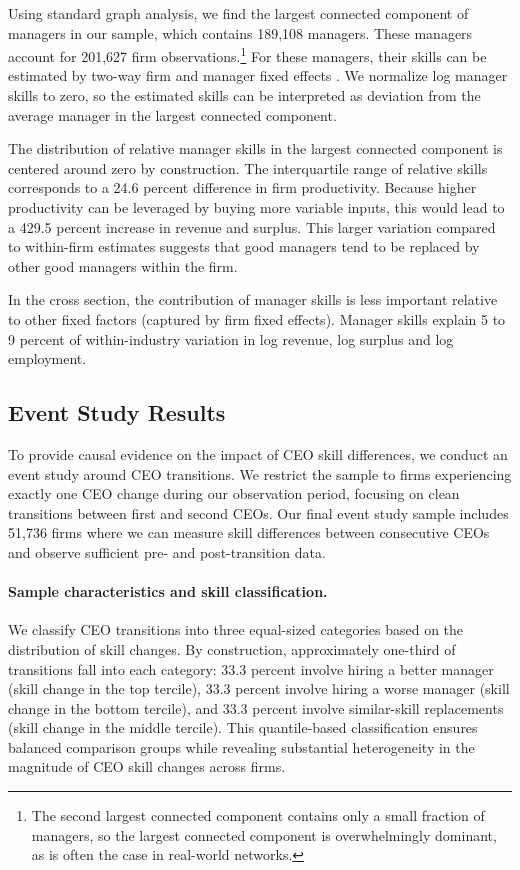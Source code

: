 \documentclass[11pt,a4paper]{article}
\begin{document}
Using standard graph analysis, we find the largest connected component of managers in our sample, which contains 189,108 managers. These managers account for 201,627 firm observations.\footnote{The second largest connected component contains only a small fraction of managers, so the largest connected component is overwhelmingly dominant, as is often the case in real-world networks.} For these managers, their skills can be estimated by two-way firm and manager fixed effects \citep{Abowd1999Econometrica,reghdfe}. We normalize log manager skills to zero, so the estimated skills can be interpreted as deviation from the average manager in the largest connected component. 

The distribution of relative manager skills in the largest connected component is centered around zero by construction. The interquartile range of relative skills corresponds to a 24.6 percent difference in firm productivity. Because higher productivity can be leveraged by buying more variable inputs, this would lead to a 429.5 percent increase in revenue and surplus. This larger variation compared to within-firm estimates suggests that good managers tend to be replaced by other good managers within the firm. 

In the cross section, the contribution of manager skills is less important relative to other fixed factors (captured by firm fixed effects). Manager skills explain 5 to 9 percent of within-industry variation in log revenue, log surplus and log employment.

\subsection{Event Study Results}

To provide causal evidence on the impact of CEO skill differences, we conduct an event study around CEO transitions. We restrict the sample to firms experiencing exactly one CEO change during our observation period, focusing on clean transitions between first and second CEOs. Our final event study sample includes 51,736 firms where we can measure skill differences between consecutive CEOs and observe sufficient pre- and post-transition data.

\paragraph{Sample characteristics and skill classification.} We classify CEO transitions into three equal-sized categories based on the distribution of skill changes. By construction, approximately one-third of transitions fall into each category: 33.3 percent involve hiring a better manager (skill change in the top tercile), 33.3 percent involve hiring a worse manager (skill change in the bottom tercile), and 33.3 percent involve similar-skill replacements (skill change in the middle tercile). This quantile-based classification ensures balanced comparison groups while revealing substantial heterogeneity in the magnitude of CEO skill changes across firms.
\end{document}
